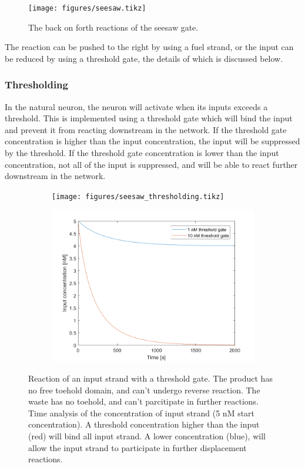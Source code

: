 \begin{figure}[h]
\texttt{[image: figures/seesaw.tikz]}
\caption{The back on forth reactions of the seesaw gate.}
\label{seesaw}
\end{figure}

The reaction can be pushed to the right by using a fuel strand, or the input can be reduced by using a threshold gate, the details of which is discussed below.

\subsubsection{Thresholding}
In the natural neuron, the neuron will activate when its inputs exceeds a threshold. This is implemented using a threshold gate which will bind the input and prevent it from reacting downstream in the network. If the threshold gate concentration is higher than the input concentration, the input will be suppressed by the threshold. If the threshold gate concentration is lower than the input concentration, not all of the input is suppressed, and will be able to react further downstream in the network.

\begin{figure}[h]
  \begin{subfigure}[t]{.49\textwidth}
    \texttt{[image: figures/seesaw\_thresholding.tikz]}
\caption{}
\label{seesaw_thresholding_reaction}
\end{subfigure}
\hfill
\begin{subfigure}[t]{.49\columnwidth}
  \centering
\includegraphics[width=\linewidth]{images/thresholding.png}
\caption{}
\label{seesaw_thresholding_analysis}
\end{subfigure}
\caption{ Reaction of an input strand with a threshold gate. The product has no free toehold domain, and can't undergo reverse reaction. The waste has no toehold, and can't parcitipate in further reactions.  Time analysis of the concentration of input strand (5 nM start concentration). A threshold concentration higher than the input (red) will bind all input strand. A lower concentration (blue), will allow the input strand to participate in further displacement reactions.}
\end{figure}

